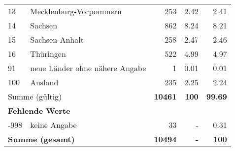 \begin{longtable}{lXrrr}
     13 &
     \multicolumn{1}{X}{ Mecklenburg-Vorpommern   } &


       \num{253} &
       \num[round-mode=places,round-precision=2]{2.42} &
         \num[round-mode=places,round-precision=2]{2.41} \\

     14 &
     \multicolumn{1}{X}{ Sachsen   } &


       \num{862} &
       \num[round-mode=places,round-precision=2]{8.24} &
         \num[round-mode=places,round-precision=2]{8.21} \\

     15 &
     \multicolumn{1}{X}{ Sachsen-Anhalt   } &


       \num{258} &
       \num[round-mode=places,round-precision=2]{2.47} &
         \num[round-mode=places,round-precision=2]{2.46} \\

     16 &
     \multicolumn{1}{X}{ Thüringen   } &


       \num{522} &
       \num[round-mode=places,round-precision=2]{4.99} &
         \num[round-mode=places,round-precision=2]{4.97} \\

     91 &
     \multicolumn{1}{X}{ neue Länder ohne nähere Angabe   } &


       \num{1} &
       \num[round-mode=places,round-precision=2]{0.01} &
         \num[round-mode=places,round-precision=2]{0.01} \\

     100 &
     \multicolumn{1}{X}{ Ausland   } &


       \num{235} &
       \num[round-mode=places,round-precision=2]{2.25} &
         \num[round-mode=places,round-precision=2]{2.24} \\
     \midrule
     \multicolumn{2}{l}{Summe (gültig)} &
       \textbf{\num{10461}} &
     \textbf{\num{100}} &
       \textbf{\num[round-mode=places,round-precision=2]{99.69}} \\
     \multicolumn{5}{l}{\textbf{Fehlende Werte}}\\
       -998 &
       keine Angabe &
         \num{33} &
        - &
         \num[round-mode=places,round-precision=2]{0.31} \\
     \midrule
     \multicolumn{2}{l}{\textbf{Summe (gesamt)}} &
          \textbf{\num{10494}} &
        \textbf{-} &
        \textbf{\num{100}} \\
     \bottomrule
     \end{longtable}
     
